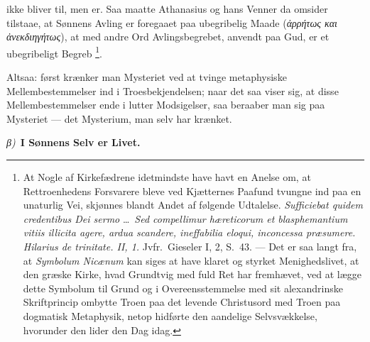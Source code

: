 \documentclass[12pt]{book}
\newcommand{\greekrun}[2]{%
  \medskip\begin{center}{\itshape #1)}\ {\bfseries #2}\end{center}\medskip}
\begin{document}
ikke bliver til, men er. Saa maatte Athanasius og hans Venner da
omsider tilstaae, at Sønnens Avling er foregaaet paa ubegribelig
Maade (\textit{ἀρρήτως και ἀνεκδιηγήτως}), at med andre Ord
Avlingsbegrebet, anvendt paa Gud, er et ubegribeligt Begreb%
\footnote{At Nogle af Kirkefædrene idetmindste have havt en Anelse
om, at Rettroenhedens Forsvarere bleve ved Kjætternes Paafund
tvungne ind paa en unaturlig Vei, skjønnes blandt Andet af følgende
Udtalelse. \textit{Sufficiebat quidem credentibus Dei sermo} \dots\
\textit{Sed compellimur hæreticorum et blasphemantium vitiis illicita
agere, ardua scandere, ineffabilia eloqui, inconcessa præsumere.}
\textit{Hilarius de trinitate. II, 1.} Jvfr.\ Gieseler I, 2, S.\ 43.
--- Det er saa langt fra, at \textit{Symbolum Nicænum} kan siges at
have klaret og styrket Menighedslivet, at den græske Kirke, hvad
Grundtvig med fuld Ret har fremhævet, ved at lægge dette Symbolum
til Grund og i Overeensstemmelse med sit alexandrinske Skriftprincip
ombytte Troen paa det levende Christusord med Troen paa dogmatisk
Metaphysik, netop hidførte den aandelige Selvsvækkelse, hvorunder
den lider den Dag idag.}.

Altsaa: først krænker man Mysteriet ved at tvinge metaphysiske
Mellembestemmelser ind i Troesbekjendelsen; naar det saa viser sig,
at disse Mellembestemmelser ende i lutter Modsigelser, saa beraaber
man sig paa Mysteriet --- det Mysterium, man selv har krænket.

\greekrun{β}{I Sønnens Selv er Livet.}
\end{document}
